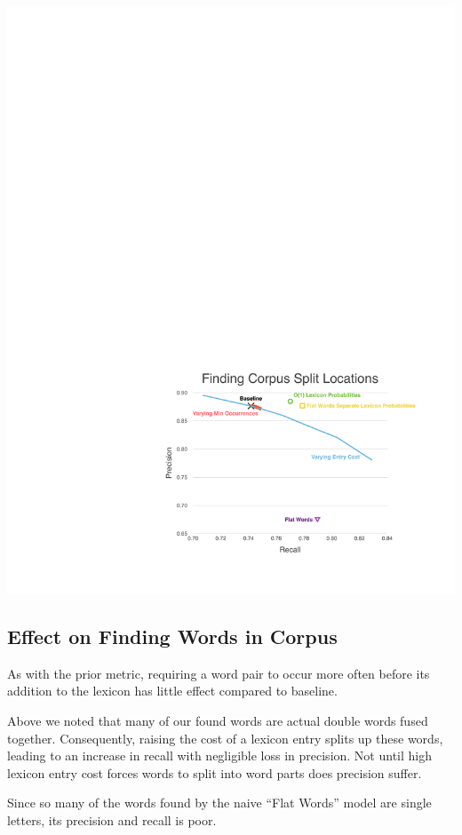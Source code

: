 \documentclass[11pt, oneside, fleqn]{article}
\begin{document}
  \includegraphics[scale=0.9]{./figure/finding_corpus_split_location.pdf}

  \subsection{Effect on Finding Words in Corpus}

	As with the prior metric, requiring a word pair to occur more often before its addition to the lexicon has little effect compared to baseline.

	Above we noted that many of our found words are actual double words fused together. Consequently, raising the cost of a lexicon entry splits up these words, leading to an increase in recall with negligible loss in precision. Not until high lexicon entry cost forces words to split into word parts does precision suffer.

	Since so many of the words found by the naive ``Flat Words'' model are single letters, its precision and recall is poor.
\end{document}
